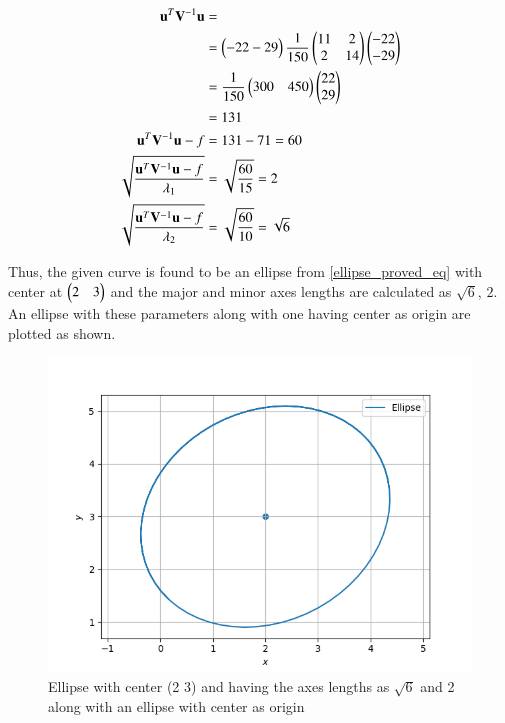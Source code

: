 \documentclass[journal,12pt,twocolumn]{IEEEtran}
\begin{document}
\begin{align}
\mathbf{u}^T\mathbf{V}^{-1}\mathbf{u} &= \nonumber \\
&= \begin{pmatrix}-22 -29\end{pmatrix}\frac{1}{150}\begin{pmatrix}11 & 2 \\ 2 &1 4 \end{pmatrix}\begin{pmatrix}-22 \\ -29\end{pmatrix} \nonumber \\
&= \frac{1}{150}\begin{pmatrix}300 & 450\end{pmatrix}\begin{pmatrix}22 \\ 29\end{pmatrix} \nonumber \\
&= 131 \nonumber \\
\mathbf{u}^T\mathbf{V}^{-1}\mathbf{u} -f &= 131 - 71 = 60 \\
\sqrt{\frac{\mathbf{u}^T\mathbf{V}^{-1}\mathbf{u} -f}{\lambda_1}} &= \sqrt{\frac{60}{15}} = 2 \\
\sqrt{\frac{\mathbf{u}^T\mathbf{V}^{-1}\mathbf{u} -f}{\lambda_2}} &= \sqrt{\frac{60}{10}} = \sqrt{6}
\end{align}

Thus, the given curve is found to be an ellipse from \eqref{ellipse_proved_eq} with center at $\begin{pmatrix}2 & 3\end{pmatrix}$ and the major and minor axes lengths are calculated as $\sqrt{6}$, $2$. An ellipse with these parameters along with one having center as origin are plotted as shown.



\begin{figure}[hb!]
\centering
\includegraphics[width=\columnwidth]{assignment_6_fig.png}
\caption{Ellipse with center (2 3) and having the axes lengths as $\sqrt{6}$ and 2 along with an ellipse with center as origin}
\label{Fig:Ellipse}
\end{figure}
\end{document}
